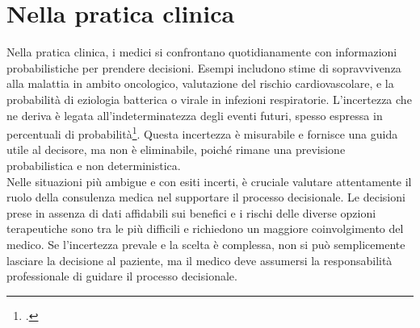 \section{Nella pratica clinica}
Nella pratica clinica, i medici si confrontano quotidianamente con informazioni probabilistiche per prendere decisioni. Esempi includono stime di sopravvivenza alla malattia in ambito oncologico, valutazione del rischio cardiovascolare, e la probabilità di eziologia batterica o virale in infezioni respiratorie. L'incertezza che ne deriva è legata all'indeterminatezza degli eventi futuri, spesso espressa in percentuali di probabilità\footcite{womak:recenti-progressi-medicina}. Questa incertezza è misurabile e fornisce una guida utile al decisore, ma non è eliminabile, poiché rimane una previsione probabilistica e non deterministica.\\
Nelle situazioni più ambigue e con esiti incerti, è cruciale valutare attentamente il ruolo della consulenza medica nel supportare il processo decisionale. Le decisioni prese in assenza di dati affidabili sui benefici e i rischi delle diverse opzioni terapeutiche sono tra le più difficili e richiedono un maggiore coinvolgimento del medico. Se l'incertezza prevale e la scelta è complessa, non si può semplicemente lasciare la decisione al paziente, ma il medico deve assumersi la responsabilità professionale di guidare il processo decisionale.\\



